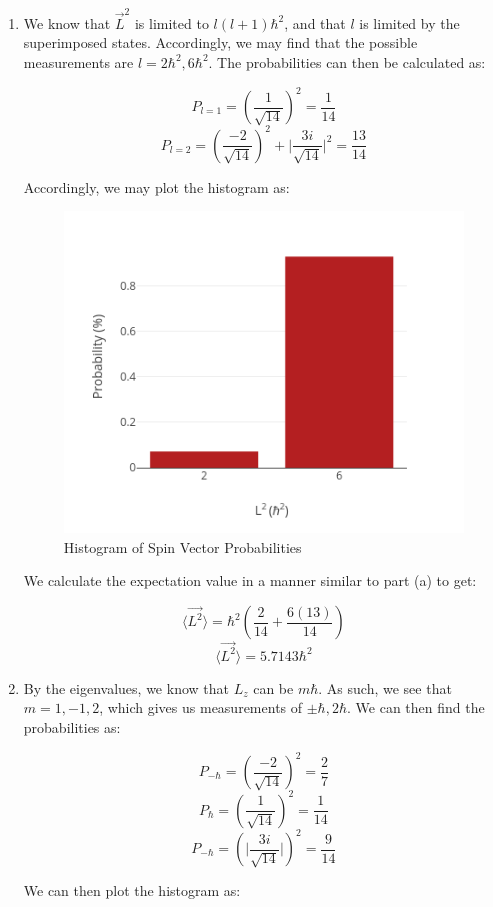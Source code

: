 \begin{enumerate}
\begin{enumerate}
      \item We know that $\vec{L}^2$ is limited to $l(l+1)\hbar^2$, and that $l$ is limited by the superimposed states. Accordingly, we may find that the possible measurements are $\boxed{l=2\hbar^2,6\hbar^2}$. The probabilities can then be calculated as:

        $$\boxed{P_{l=1}=\left( \frac{1}{\sqrt{14}} \right)^2=\frac{1}{14}}$$
        $$\boxed{P_{l=2}=\left( \frac{-2}{\sqrt{14}} \right)^2+\Big|\frac{3i}{\sqrt{14}}\Big|^2=\frac{13}{14}}$$

        Accordingly, we may plot the histogram as:

        \begin{figure}[H]
          \centering
          \includegraphics[width=.5\textwidth]{Figures/HW8-2b}
          \caption{Histogram of Spin Vector Probabilities}
          \label{fig:2}
        \end{figure}

        We calculate the expectation value in a manner similar to part (a) to get:

        $$\langle \vec{L^2}\rangle=\hbar^2\left( \frac{2}{14}+\frac{6(13)}{14} \right)$$
        $$\boxed{\langle \vec{L^2}\rangle=5.7143\hbar^2}$$

      \item By the eigenvalues, we know that $L_z$ can be $m\hbar$. As such, we see that $m=1,-1,2$, which gives us measurements of $\pm\hbar,2\hbar$. We can then find the probabilities as:

        $$\boxed{P_{-\hbar}=\left( \frac{-2}{\sqrt{14}} \right)^2=\frac{2}{7}}$$
        $$\boxed{P_{\hbar}=\left( \frac{1}{\sqrt{14}} \right)^2=\frac{1}{14}}$$
        $$\boxed{P_{-\hbar}=\left( \Big|\frac{3i}{\sqrt{14}} \Big|\right)^2=\frac{9}{14}}$$

        We can then plot the histogram as:


\end{enumerate}
\end{enumerate}

